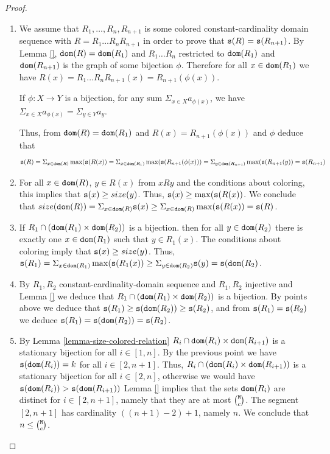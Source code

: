 \documentclass{lmcs}
\begin{document}
\begin{proof}

\begin{enumerate}
\item
We assume that $R_1, \ldots, R_n, R_{n+1}$ is some colored constant-cardinality domain 
sequence  with $R = R_1 \ldots R_n R_{n+1}$ in order to prove that
${\tt s}(R) = {\tt s}(R_{n+1})$.
By Lemma \ref{}, ${\tt dom}(R) = {\tt dom}(R_1)$
and $R_1 \ldots R_n$ restricted to ${\tt dom}(R_1)$ and  ${\tt dom}(R_{n+1})$ 
is the graph of some bijection $\phi$. Therefore for
all $x \in {\tt dom}(R_1)$ we have $R(x) = R_1 \ldots R_n R_{n+1}(x) = R_{n+1}(\phi(x))$.

If $\phi:X \rightarrow Y$ is a bijection, for any sum $\Sigma_{x \in X} a_{\phi(x)}$, 
we have $\Sigma_{x \in X} a_{\phi(x)} = \Sigma_{y \in Y} a_y$. 

Thus, from ${\tt dom}(R) = {\tt dom}(R_1)$ and $R(x) = R_{n+1}(\phi(x))$ and $\phi$ deduce that 
$$
{\tt s}(R) =
\Sigma_{x \in {\tt dom}(R)} \max({\tt s}(R(x)) = 
\Sigma_{x \in {\tt dom}(R_1)} \max({\tt s}( R_{n+1}(\phi(x))) =
\Sigma_{y \in {\tt dom}(R_{n+1})} \max({\tt s}( R_{n+1}(y)) =
{\tt s}(R_{n+1})
$$

\item
For all $x \in {\tt dom}(R)$, $y \in R(x)$ from $x R y$ and the conditions 
about coloring, this implies that ${\tt s}(x) \ge size(y)$. Thus, ${\tt s}(x) \ge \max({\tt s}(R(x))$.
We conclude that $size({\tt dom}(R)) = \Sigma_{x \in {\tt dom}(R)} {\tt s}(x) \ge 
\Sigma_{x \in {\tt dom}(R)} \max({\tt s}(R(x)) = {\tt s}(R)$.

\item
If $R_1 \cap ({\tt dom}(R_1) \times {\tt dom}(R_2))$ is a bijection.
then for all $y \in {\tt dom}(R_2)$ there is exactly  one $x \in {\tt dom}(R_1)$
such that $y \in R_1(x)$. The conditions about coloring imply that ${\tt s}(x) \ge size(y)$. 
Thus, $ {\tt s}(R_1) = \Sigma_{x \in {\tt dom}(R_1)} \max({\tt s}(R_1(x)) \ge 
\Sigma_{y \in {\tt dom}(R_2)} {\tt s}(y) = {\tt s}({\tt dom}(R_2)$.

\item
By $R_1, R_2$ constant-cardinality-domain sequence and $R_1, R_2$ injective and
Lemma \ref{} we deduce that $R_1 \cap ({\tt dom}(R_1) \times {\tt dom}(R_2))$ is a bijection.
By points above we deduce that ${\tt s}(R_1) \ge {\tt s}({\tt dom}(R_2)) \ge {\tt s}(R_2)$,
and from ${\tt s}(R_1) = {\tt s}(R_2)$ we deduce 
${\tt s}(R_1) = {\tt s}({\tt dom}(R_2)) = {\tt s}(R_2)$. 

\item
By Lemma \ref{lemma-size-colored-relation} $R_i \cap {\tt dom}(R_i) \times {\tt dom}(R_{i+1})$ 
is a stationary bijection for all $i \in [1,n ]$. By the previous point we have 
${\tt s}({\tt dom}(R_i)) = k$ for all $i \in [2,n+1]$. Thus, $R_i \cap ({\tt dom}(R_i) \times 
{\tt dom}(R_{i+1}))$ is a stationary bijection for all $i \in [2,n]$, otherwise we would have
${\tt s}({\tt dom}(R_i)) > {\tt s}({\tt dom}(R_{i+1}))$
Lemma \ref{} implies that the sets ${\tt dom}(R_i)$ are distinct 
for $i \in [2,n+1]$, namely that they are at most $\newton{\MaxInd}{c}$.
The segment  $[2,n+1]$ has cardinality $((n+1)-2)+1$, namely $n$.
We conclude that $n \le \newton{\MaxInd}{c}$.
\end{enumerate}
\end{proof}
\end{document}
